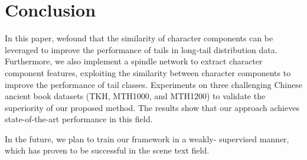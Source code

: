 \section{Conclusion}

In this paper, wefound that the similarity of character components can be leveraged to improve the performance of tails in long-tail distribution data.
Furthermore, we also implement a spindle network to extract character component features, exploiting the similarity between character components to improve the performance of tail classes.
Experiments on three challenging Chinese ancient book datasets (TKH, MTH1000, and MTH1200) to validate the superiority of our proposed method. The results show that our approach achieves state-of-the-art performance in this field.

In the future, we plan to train our framework in a weakly- supervised manner, which has proven to be successful in the scene text field.

